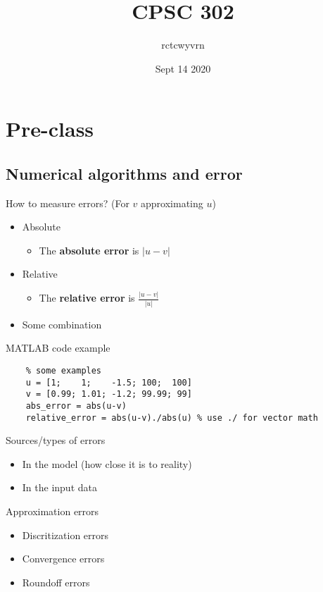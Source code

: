 \documentclass{article}
\title{CPSC 302}
\author{rctcwyvrn}
\date{Sept 14 2020}
\begin{document}
\maketitle

\section{Pre-class}
\subsection{Numerical algorithms and error}
How to measure errors? (For $v$ approximating $u$) 
\begin{itemize}
	\item Absolute
	\begin{itemize}
		\item The {\color{blue} \textbf{absolute error}} is $|u-v|$
	\end{itemize}
	\item Relative
	\begin{itemize}
		\item The {\color{blue} \textbf{relative error}} is $\frac{|u-v|}{|u|}$
	\end{itemize}
	\item Some combination
\end{itemize}
MATLAB code example
\begin{lstlisting}
	% some examples
	u = [1;	   1;    -1.5; 100;  100]
	v = [0.99; 1.01; -1.2; 99.99; 99]
	abs_error = abs(u-v)
	relative_error = abs(u-v)./abs(u) % use ./ for vector math
\end{lstlisting}
Sources/types of errors
\begin{itemize}
	\item In the model (how close it is to reality)
	\item In the input data
\end{itemize}
Approximation errors
\begin{itemize}
	\item Discritization errors
	\item Convergence errors
	\item Roundoff errors
\end{itemize}
\end{document}
